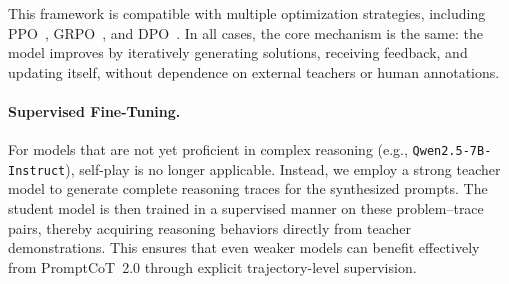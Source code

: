 This framework is compatible with multiple optimization strategies, including PPO~\citep{schulman2017proximal}, GRPO~\citep{shao2024deepseekmath}, and DPO~\citep{rafailov2023direct}.
In all cases, the core mechanism is the same: the model improves by iteratively generating solutions, receiving feedback, and updating itself, without dependence on external teachers or human annotations.



\paragraph{Supervised Fine-Tuning.} For models that are not yet proficient in complex reasoning (e.g., \texttt{Qwen2.5-7B-Instruct}), self-play is no longer applicable. Instead, we employ a strong teacher model to generate complete reasoning traces for the synthesized prompts. The student model is then trained in a supervised manner on these problem–trace pairs, thereby acquiring reasoning behaviors directly from teacher demonstrations. This ensures that even weaker models can benefit effectively from PromptCoT~2.0 through explicit trajectory-level supervision.


